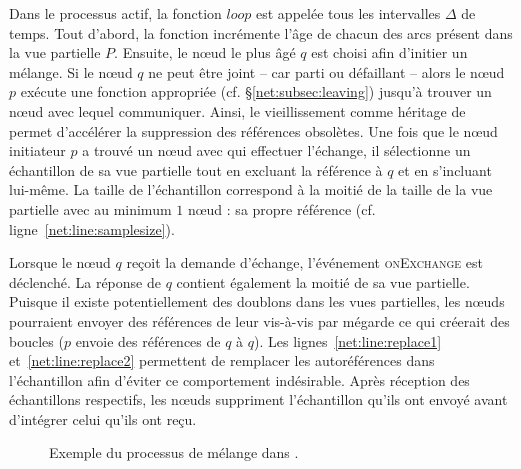 Dans le processus actif, la fonction $loop$ est appelée tous les intervalles
$\Delta$ de temps. Tout d'abord, la fonction incrémente l'âge de chacun des arcs
présent dans la vue partielle $P$. Ensuite, le nœud le plus âgé $q$ est choisi
afin d'initier un mélange. Si le nœud $q$ ne peut être joint -- car parti ou
défaillant -- alors le nœud $p$ exécute une fonction appropriée (cf.
§\ref{net:subsec:leaving}) jusqu'à trouver un nœud avec lequel
communiquer. Ainsi, le vieillissement comme héritage de \CYCLON permet
d'accélérer la suppression des références obsolètes. Une fois que le nœud
initiateur $p$ a trouvé un nœud avec qui effectuer l'échange, il sélectionne un
échantillon de sa vue partielle tout en excluant la référence à $q$ et en
s'incluant lui-même. La taille de l'échantillon correspond à la moitié de la
taille de la vue partielle avec au minimum $1$ nœud : sa propre référence
(cf. ligne~\ref{net:line:samplesize}).


Lorsque le nœud $q$ reçoit la demande d'échange, l'événement \textsc{onExchange}
est déclenché. La réponse de $q$ contient également la moitié de sa vue
partielle. Puisque il existe potentiellement des doublons dans les vues
partielles, les nœuds pourraient envoyer des références de leur vis-à-vis par
mégarde ce qui créerait des boucles ($p$ envoie des références de $q$ à
$q$). Les lignes~\ref{net:line:replace1} et~\ref{net:line:replace2} permettent de
remplacer les autoréférences dans l'échantillon afin d'éviter ce comportement
indésirable. Après réception des échantillons respectifs, les nœuds suppriment
l'échantillon qu'ils ont envoyé avant d'intégrer celui qu'ils ont reçu.

\begin{figure*}
  \centering
  \hspace{40pt}
  \hspace{10pt}
  \caption[Processus de mélange périodique dans \SPRAY]
  {\label{net:fig:cyclicexample}Exemple du processus de mélange dans \SPRAY.}
\end{figure*}

